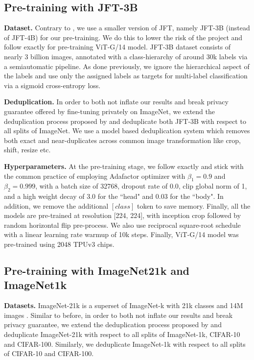 \documentclass[letterpaper]{article} \usepackage{fullpage}
\begin{document}
\subsection{Pre-training with JFT-3B}
\textbf{Dataset.}
Contrary to \cite{mehta2022large,dm_transfer_2022}, we use a smaller version of JFT, namely JFT-3B (instead of JFT-4B) for our pre-training. We do this to lower the risk of the project and follow \cite{zhai2021scaling} exactly for pre-training ViT-G/14 model. JFT-3B dataset consists of nearly 3 billion images, annotated with a class-hierarchy of around 30k labels via a semiautomatic pipeline. As done previously, we ignore the hierarchical aspect of the labels and use only the assigned labels as targets for multi-label classification via a sigmoid cross-entropy loss.

\textbf{Deduplication.} In order to both not inflate our results and break privacy guarantee offered by fine-tuning privately on ImageNet, we extend the deduplication process proposed by \cite{bit-paper} and deduplicate both JFT-3B with respect to all splits of ImageNet. We use a model based deduplication system which removes both exact and near-duplicates across common image transformation like crop, shift, resize etc.

\textbf{Hyperparameters.}
At the pre-training stage, we follow \cite{zhai2021scaling} exactly and stick with the common practice of employing Adafactor optimizer with $\beta_1= 0.9$ and $\beta_2 = 0.999$, with a batch size of 32768, dropout rate of 0.0, clip global norm of 1, and a high weight decay of 3.0 for the ``head" and 0.03 for the ``body". In addition, we remove the additional $[class]$ token to save memory. Finally, all the models are pre-trained at resolution [224, 224], with inception crop followed by random horizontal flip pre-process. We also use reciprocal square-root schedule with a linear learning rate warmup of 10k steps. Finally, ViT-G/14 model was pre-trained using 2048 TPUv3 chips.

\subsection{Pre-training with ImageNet21k and ImageNet1k}
\label{sec:i21k}

\textbf{Datasets.} ImageNet-21k is a superset of ImageNet-k with 21k classes and 14M images \citep{deng2009imagenet}. Similar to before, in order to both not inflate our results and break privacy guarantee, we extend the deduplication process proposed by \cite{bit-paper} and deduplicate ImageNet-21k with respect to all splits of ImageNet-1k, CIFAR-10 and CIFAR-100. Similarly, we deduplicate ImageNet-1k with respect to all splits of CIFAR-10 and CIFAR-100.
\end{document}
